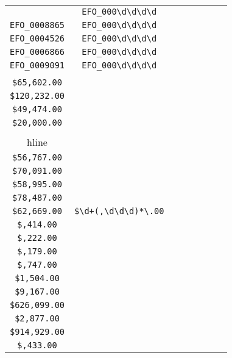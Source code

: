 \begin{longtable}{cccccccc}
\begin{tabular}{ll}
    \verb|EFO_0004348| & \verb|EFO_000\d\d\d\d|\\
\verb|EFO_0008865| & \verb|EFO_000\d\d\d\d|\\
\verb|EFO_0004526| & \verb|EFO_000\d\d\d\d|\\
\verb|EFO_0006866| & \verb|EFO_000\d\d\d\d|\\
\verb|EFO_0009091| & \verb|EFO_000\d\d\d\d|
\end{tabular}
\\\midrule 
\begin{tabular}{l}
    \verb|$42,644.00|\\
\verb|$65,602.00|\\
\verb|$120,232.00|\\
\verb|$49,474.00|\\
\verb|$20,000.00|\\
\\hline\\
\verb|$56,767.00|\\
\verb|$70,091.00|\\
\verb|$58,995.00|\\
\verb|$78,487.00|\\
\verb|$62,669.00|
\end{tabular}

&
\verb|$\d+(,\d\d\d)*\.00|
&

\begin{tabular}{l}
    \verb|$(\d)*,\d\d\d\.00|\\
\verb|$,414.00|\\
\verb|$,222.00|\\
\verb|$,179.00|\\
\verb|$,747.00|\\
\verb|$1,504.00|
\end{tabular}

&

\begin{tabular}{l}
    \verb|$(\d)*,\d\d\d\.00|\\
\verb|$9,167.00|\\
\verb|$626,099.00|\\
\verb|$2,877.00|\\
\verb|$914,929.00|\\
\verb|$,433.00|
\end{tabular}

&


\end{longtable}
